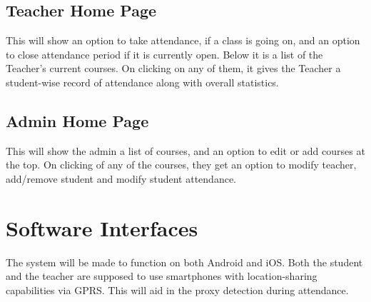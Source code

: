 \documentclass{scrreprt}
\begin{document}
\subsection{Teacher Home Page}
This will show an option to take attendance, if a class is going on, and an option to close attendance period if it is currently open.
Below it is a list of the Teacher's current courses. On clicking on any of them, it gives the Teacher a student-wise record of attendance along with overall statistics. 

\subsection{Admin Home Page}
This will show the admin a list of courses, and an option to edit or add courses at the top. On clicking of any of the courses, they get an option to modify teacher, add/remove student and modify student attendance.


\section{Software Interfaces}
The system will be made to function on both Android and iOS. Both the student and the teacher are supposed to use smartphones with location-sharing capabilities via GPRS. This will aid in the proxy detection during attendance.

\end{document}
